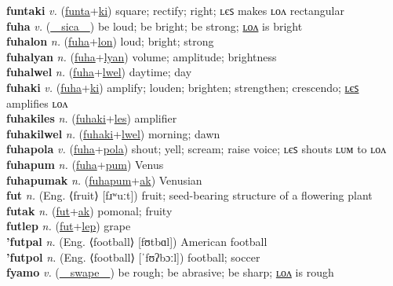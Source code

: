 \textbf{funtaki} \textit{v.} (\hyperref[funta]{funta}+\hyperref[ki]{ki})
square; rectify; right; ʟєꜱ makes ʟᴏᴧ rectangular \label{funtaki} \\
\textbf{fuha} \textit{v.} (\hyperref[sica]{~~sica~~})
be loud; be bright; be strong; \hyperref[fuhalon]{ʟᴏᴧ} is bright \label{fuha} \\
\textbf{fuhalon} \textit{n.} (\hyperref[fuha]{fuha}+\hyperref[lon]{lon})
loud; bright; strong \label{fuhalon} \\
\textbf{fuhalyan} \textit{n.} (\hyperref[fuha]{fuha}+\hyperref[lyan]{lyan})
volume; amplitude; brightness \label{fuhalyan} \\
\textbf{fuhalwel} \textit{n.} (\hyperref[fuha]{fuha}+\hyperref[lwel]{lwel})
daytime; day \label{fuhalwel} \\
\textbf{fuhaki} \textit{v.} (\hyperref[fuha]{fuha}+\hyperref[ki]{ki})
amplify; louden; brighten; strengthen; crescendo; \hyperref[fuhakiles]{ʟєꜱ} amplifies ʟᴏᴧ \label{fuhaki} \\
\textbf{fuhakiles} \textit{n.} (\hyperref[fuhaki]{fuhaki}+\hyperref[les]{les})
amplifier \label{fuhakiles} \\
\textbf{fuhakilwel} \textit{n.} (\hyperref[fuhaki]{fuhaki}+\hyperref[lwel]{lwel})
morning; dawn \label{fuhakilwel} \\
\textbf{fuhapola} \textit{v.} (\hyperref[fuha]{fuha}+\hyperref[pola]{pola})
shout; yell; scream; raise voice; ʟєꜱ shouts ʟᴜᴍ to ʟᴏᴧ \label{fuhapola} \\
\textbf{fuhapum} \textit{n.} (\hyperref[fuha]{fuha}+\hyperref[pum]{pum})
Venus \label{fuhapum} \\
\textbf{fuhapumak} \textit{n.} (\hyperref[fuhapum]{fuhapum}+\hyperref[ak]{ak})
Venusian \label{fuhapumak} \\
\textbf{fut} \textit{n.} (Eng. ⟨fruit⟩ [fɹʷuːt])
fruit; seed-bearing structure of a flowering plant \label{fut} \\
\textbf{futak} \textit{n.} (\hyperref[fut]{fut}+\hyperref[ak]{ak})
pomonal; fruity \label{futak} \\
\textbf{futlep} \textit{n.} (\hyperref[fut]{fut}+\hyperref[lep]{lep})
grape \label{futlep} \\
\textbf{'futpal} \textit{n.} (Eng. ⟨football⟩ [fʊtbɑl])
American football \label{'futpal} \\
\textbf{'futpol} \textit{n.} (Eng. ⟨football⟩ [ˈfʊʔbɔːl])
football; soccer \label{'futpol} \\
\textbf{fyamo} \textit{v.} (\hyperref[swape]{~~swape~~})
be rough; be abrasive; be sharp; \hyperref[fyamolon]{ʟᴏᴧ} is rough \label{fyamo} \\
